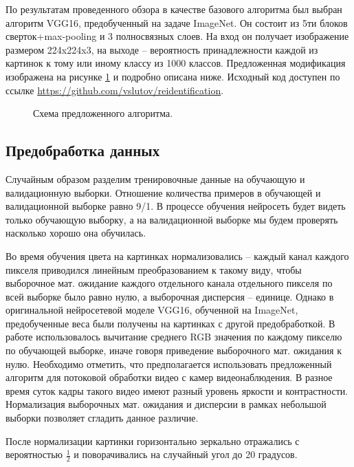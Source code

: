 \documentclass[a4paper]{article}
\begin{document}
\begin{multicols*}{2}
По результатам проведенного обзора в качестве базового алгоритма был выбран алгоритм VGG16, предобученный на задаче ImageNet. Он состоит из 5ти блоков сверток+max-pooling и 3 полносвязных слоев. На вход он получает изображение размером 224x224x3, на выходе -- вероятность принадлежности каждой из картинок к тому или иному классу из 1000 классов. Предложенная модификация изображена на рисунке \ref{architecture} и подробно описана ниже. Исходный код доступен по ссылке \url{https://github.com/vslutov/reidentification}.

\begin{figure}[H]
    \caption{Схема предложенного алгоритма.}
    \label{architecture}
\end{figure}

\subsection {Предобработка данных}

Случайным образом разделим тренировочные данные на обучающую и валидационную выборки. Отношение количества примеров в обучающей и валидационной выборке равно 9/1. В процессе обучения нейросеть будет видеть только обучающую выборку, а на валидационной выборке мы будем проверять насколько хорошо она обучилась.

Во время обучения цвета на картинках нормализовались -- каждый канал каждого пикселя приводился линейным преобразованием к такому виду, чтобы выборочное мат. ожидание каждого отдельного канала отдельного пикселя по всей выборке было равно нулю, а выборочная дисперсия -- единице. Однако в оригинальной нейросетевой моделе VGG16, обученной на ImageNet\cite{vgg}, предобученные веса были получены на картинках с другой предобработкой. В работе\cite{vgg} использовалось вычитание среднего RGB значения по каждому пикселю по обучающей выборке, иначе говоря приведение выборочного мат. ожидания к нулю. Необходимо отметить, что предполагается использовать предложенный алгоритм для потоковой обработки видео с камер видеонаблюдения. В разное время суток кадры такого видео имеют разный уровень яркости и контрастности. Нормализация выборочных мат. ожидания и дисперсии в рамках небольшой выборки позволяет сгладить данное различие.

После нормализации картинки горизонтально зеркально отражались с вероятностью $\frac{1}{2}$ и поворачивались на случайный угол до 20 градусов.


\end{multicols*}
\end{document}
